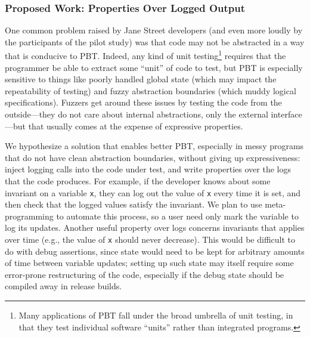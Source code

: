 \subsubsection{Proposed Work: Properties Over Logged Output}
One common problem raised by Jane Street developers (and even more loudly by the
participants of the pilot study) was
that code may not be abstracted
in a way that is conducive to PBT. Indeed, any kind of unit
testing\footnote{Many applications of PBT fall under the broad umbrella of unit
testing, in that they test individual software ``units'' rather than integrated
programs.} requires
that the programmer be able to extract some ``unit'' of code to test, but PBT is
especially sensitive to things like poorly handled global state (which may
impact the repeatability of testing) and fuzzy
abstraction boundaries (which muddy logical specifications). Fuzzers  get around these issues by
testing the code from the outside---they do not care about internal
abstractions, only the external interface---but that usually comes at the
expense of expressive properties.

We hypothesize a solution that enables better PBT,
especially in messy programs that do not have clean abstraction boundaries,
without giving
up expressiveness: inject logging calls into the code under test, and write
properties over the logs that the code produces. For example, if the developer
knows about some invariant on a variable \lstinline{x}, they can log out the
value of \lstinline{x} every time it is set, and then check that the logged
values satisfy the invariant. We plan to use meta-programming to automate this
process, so a user need only mark the variable to log its updates. Another
useful property over logs concerns
invariants that applies over time (e.g., the value of \lstinline{x} should
never decrease).
This would be difficult to do with debug assertions, since state would need to
be kept for arbitrary amounts of time between variable updates; setting up such
state may itself require some error-prone restructuring of the code, especially
if the debug state should be compiled away in release builds.

